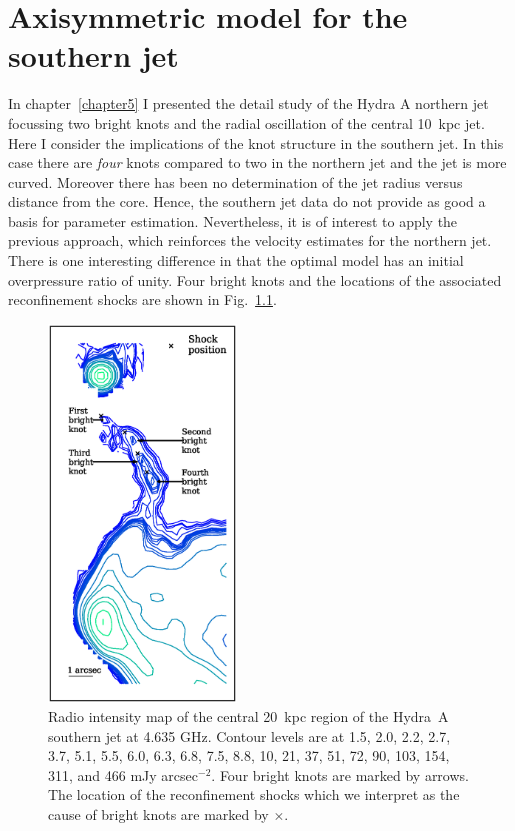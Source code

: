 \chapter{Axisymmetric model for the southern jet}
\label{chapter8}


In chapter~\ref{chapter5} I presented the detail study of the Hydra A northern jet focussing two bright knots and the radial oscillation of the central 10~kpc jet. Here I consider the implications of the knot structure in the southern jet. In this case there are \emph{four} knots compared to two in the northern jet and the jet is more curved. Moreover there has been no determination of the jet radius versus distance from the core. Hence, the southern jet data do not provide as good a basis for parameter estimation. Nevertheless, it is of interest to apply the previous approach, which reinforces the velocity estimates for the northern jet. There is one interesting difference in that the optimal model has an initial overpressure ratio of unity. Four bright knots and the locations of the associated reconfinement shocks are shown in Fig.~\ref{southern}.

\begin{figure}
\centering
\includegraphics[width=5cm]{southern.eps}
\caption{ Radio intensity map of the central 20~kpc region of the Hydra~A southern jet at 4.635 GHz. Contour levels are at 1.5, 2.0, 2.2, 2.7, 3.7, 5.1, 5.5, 6.0, 6.3, 6.8, 7.5, 8.8, 10, 21, 37, 51,  72, 90, 103, 154, 311, and 466 mJy arcsec$^{-2}$. Four bright knots are marked by arrows. The location of the reconfinement shocks which we interpret as the cause of bright knots are marked by $\times$. }
\label{southern}
\end{figure}

